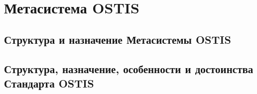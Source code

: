\chapter{Метасистема OSTIS}
\label{chapter_ims_standard}

\section{Структура и назначение Метасистемы OSTIS}
\section{Структура, назначение, особенности и достоинства Стандарта OSTIS}

%